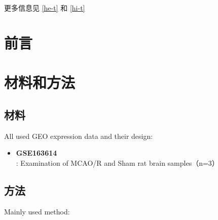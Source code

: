\documentclass[
]{article}
\providecommand{\tightlist}{%
  \setlength{\itemsep}{0pt}\setlength{\parskip}{0pt}}
\begin{document}
更多信息见 \ref{he-t} 和 \ref{hi-t}

\hypertarget{introduction}{%
\section{前言}\label{introduction}}

\hypertarget{methods}{%
\section{材料和方法}\label{methods}}

\hypertarget{ux6750ux6599}{%
\subsection{材料}\label{ux6750ux6599}}

All used GEO expression data and their design:

\begin{itemize}
\tightlist
\item
  \textbf{GSE163614}: Examination of MCAO/R and Sham rat brain samples（n=3）
\end{itemize}

\hypertarget{ux65b9ux6cd5}{%
\subsection{方法}\label{ux65b9ux6cd5}}

Mainly used method:
\end{document}
